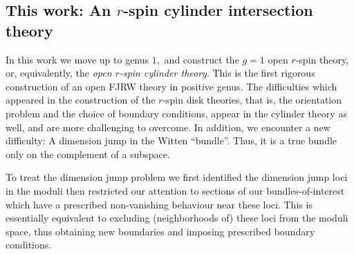 \documentclass[11pt]{amsart}
\theoremstyle{definition}
\theoremstyle{remark}
\newcommand{\<}{\left<}
\renewcommand{\>}{\right>}
\numberwithin{equation}{section}
\begin{document}
\subsection{This work: An $r$-spin cylinder intersection theory}
In this work we move up to genus $1,$ and construct the $g=1$ open $r$-spin %
theory, or, equivalently, the %
\emph{open $r$-spin cylinder theory}. This is the first rigorous construction of an open FJRW theory in positive genus.
The difficulties which appeared in the construction of the $r$-spin disk theories, %
that is, the %
orientation problem and the choice of boundary conditions, appear in the cylinder theory as well, and are more challenging to overcome. In addition, we encounter a new %
difficulty: A dimension %
jump in the %
Witten ``bundle''. Thus, %
it is a true bundle only on the complement of a subspace.

To treat the dimension jump problem we first identified the dimension jump loci in %
the moduli then %
restricted our attention to sections of our bundles-of-interest which have a %
prescribed non-vanishing behaviour %
near these loci.
This is essentially equivalent to %
excluding (neighborhoods of) %
these loci from the moduli space, thus obtaining %
new boundaries and %
imposing prescribed boundary conditions.
 
\end{document}
